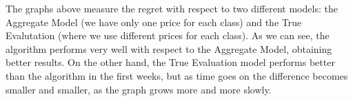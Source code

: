 
The graphs above measure the regret with respect to two different models: the Aggregate Model (we have only one price for each class) and the True Evalutation (where we use different prices for each class). As we can see, the algorithm performs very well with respect to the Aggregate Model, obtaining better results. On the other hand, the True Evaluation model performs better than the algorithm in the first weeks, but as time goes on the difference becomes smaller and smaller, as the graph grows more and more slowly. 